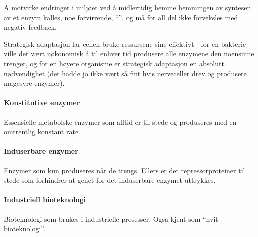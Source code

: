 Å motvirke endringer i miljøet ved å midlertidig hemme hemmingen av syntesen av et enzym kalles, noe forvirrende, ``'', og må for all del ikke forveksles med negativ feedback.

Strategisk adaptasjon lar cellen bruke ressursene sine effektivt - for en bakterie ville det vært uøkonomisk å til enhver tid produsere alle enzymene den noensinne trenger, og for en høyere organisme er strategisk adaptasjon en absolutt nødvendighet (det hadde jo ikke vært så fint hvis nerveceller drev og produsere magesyre-enzymer).

\paragraph{Konstitutive enzymer} Essensielle metabolske enzymer som alltid er til stede og produseres med en omtrentlig konstant rate.

\paragraph{Induserbare enzymer} Enzymer som kun produseres når de trengs. Ellers er det repressorproteiner til stede som forhindrer at genet for det induserbare enzymet uttrykkes.

\paragraph{Industriell bioteknologi} Bioteknologi som brukes i industrielle prosesser. Også kjent som ``hvit bioteknologi''.

